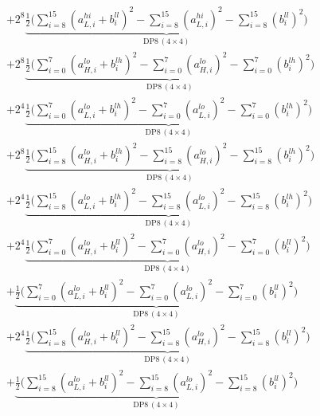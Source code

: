\documentclass[fleqn]{article}
\newcommand{\DPop}[3]{\mathrm{DP#1}\,(#2\!\times\!#3)}
\begin{document}
\begin{align*}
  & + 2^{8}\underbrace{\tfrac{1}{2}\Big(\sum_{i=8}^{15}(a_{L,i}^{hi}{+}b_i^{ll})^2 - \sum_{i=8}^{15}(a_{L,i}^{hi})^2 - \sum_{i=8}^{15}(b_i^{ll})^2\Big)}_{\DPop{8}{4}{4}} \\[0.3em]
  & + 2^{8}\underbrace{\tfrac{1}{2}\Big(\sum_{i=0}^{7}(a_{H,i}^{lo}{+}b_i^{lh})^2 - \sum_{i=0}^{7}(a_{H,i}^{lo})^2 - \sum_{i=0}^{7}(b_i^{lh})^2\Big)}_{\DPop{8}{4}{4}} \\[0.3em]
  & + 2^{4}\underbrace{\tfrac{1}{2}\Big(\sum_{i=0}^{7}(a_{L,i}^{lo}{+}b_i^{lh})^2 - \sum_{i=0}^{7}(a_{L,i}^{lo})^2 - \sum_{i=0}^{7}(b_i^{lh})^2\Big)}_{\DPop{8}{4}{4}} \\[0.3em]
  & + 2^{8}\underbrace{\tfrac{1}{2}\Big(\sum_{i=8}^{15}(a_{H,i}^{lo}{+}b_i^{lh})^2 - \sum_{i=8}^{15}(a_{H,i}^{lo})^2 - \sum_{i=8}^{15}(b_i^{lh})^2\Big)}_{\DPop{8}{4}{4}} \\[0.3em]
  & + 2^{4}\underbrace{\tfrac{1}{2}\Big(\sum_{i=8}^{15}(a_{L,i}^{lo}{+}b_i^{lh})^2 - \sum_{i=8}^{15}(a_{L,i}^{lo})^2 - \sum_{i=8}^{15}(b_i^{lh})^2\Big)}_{\DPop{8}{4}{4}} \\[0.3em]
  & + 2^{4}\underbrace{\tfrac{1}{2}\Big(\sum_{i=0}^{7}(a_{H,i}^{lo}{+}b_i^{ll})^2 - \sum_{i=0}^{7}(a_{H,i}^{lo})^2 - \sum_{i=0}^{7}(b_i^{ll})^2\Big)}_{\DPop{8}{4}{4}} \\[0.3em]
  & + \underbrace{\tfrac{1}{2}\Big(\sum_{i=0}^{7}(a_{L,i}^{lo}{+}b_i^{ll})^2 - \sum_{i=0}^{7}(a_{L,i}^{lo})^2 - \sum_{i=0}^{7}(b_i^{ll})^2\Big)}_{\DPop{8}{4}{4}} \\[0.3em]
  & + 2^{4}\underbrace{\tfrac{1}{2}\Big(\sum_{i=8}^{15}(a_{H,i}^{lo}{+}b_i^{ll})^2 - \sum_{i=8}^{15}(a_{H,i}^{lo})^2 - \sum_{i=8}^{15}(b_i^{ll})^2\Big)}_{\DPop{8}{4}{4}} \\[0.3em]
  & + \underbrace{\tfrac{1}{2}\Big(\sum_{i=8}^{15}(a_{L,i}^{lo}{+}b_i^{ll})^2 - \sum_{i=8}^{15}(a_{L,i}^{lo})^2 - \sum_{i=8}^{15}(b_i^{ll})^2\Big)}_{\DPop{8}{4}{4}}
\end{align*}
\end{document}
